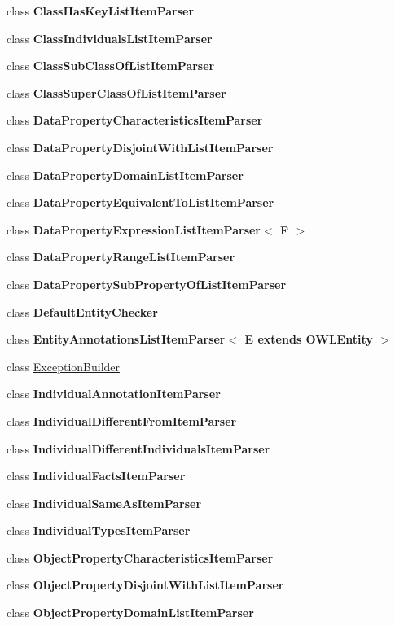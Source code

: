 \begin{DoxyCompactItemize}
\item 
class {\bfseries Class\-Has\-Key\-List\-Item\-Parser}
\item 
class {\bfseries Class\-Individuals\-List\-Item\-Parser}
\item 
class {\bfseries Class\-Sub\-Class\-Of\-List\-Item\-Parser}
\item 
class {\bfseries Class\-Super\-Class\-Of\-List\-Item\-Parser}
\item 
class {\bfseries Data\-Property\-Characteristics\-Item\-Parser}
\item 
class {\bfseries Data\-Property\-Disjoint\-With\-List\-Item\-Parser}
\item 
class {\bfseries Data\-Property\-Domain\-List\-Item\-Parser}
\item 
class {\bfseries Data\-Property\-Equivalent\-To\-List\-Item\-Parser}
\item 
class {\bfseries Data\-Property\-Expression\-List\-Item\-Parser$<$ F $>$}
\item 
class {\bfseries Data\-Property\-Range\-List\-Item\-Parser}
\item 
class {\bfseries Data\-Property\-Sub\-Property\-Of\-List\-Item\-Parser}
\item 
class {\bfseries Default\-Entity\-Checker}
\item 
class {\bfseries Entity\-Annotations\-List\-Item\-Parser$<$ E extends O\-W\-L\-Entity $>$}
\item 
class \hyperlink{classorg_1_1coode_1_1owlapi_1_1manchesterowlsyntax_1_1_manchester_o_w_l_syntax_editor_parser_1_1_exception_builder}{Exception\-Builder}
\item 
class {\bfseries Individual\-Annotation\-Item\-Parser}
\item 
class {\bfseries Individual\-Different\-From\-Item\-Parser}
\item 
class {\bfseries Individual\-Different\-Individuals\-Item\-Parser}
\item 
class {\bfseries Individual\-Facts\-Item\-Parser}
\item 
class {\bfseries Individual\-Same\-As\-Item\-Parser}
\item 
class {\bfseries Individual\-Types\-Item\-Parser}
\item 
class {\bfseries Object\-Property\-Characteristics\-Item\-Parser}
\item 
class {\bfseries Object\-Property\-Disjoint\-With\-List\-Item\-Parser}
\item 
class {\bfseries Object\-Property\-Domain\-List\-Item\-Parser}

\end{DoxyCompactItemize}
